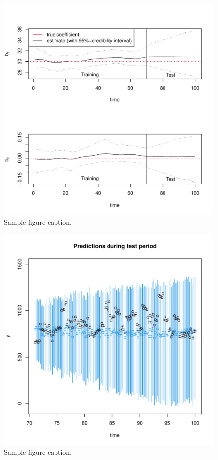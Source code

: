 \documentclass{article}
\begin{document}
\begin{figure}
	\centering
	\includegraphics{coefficients_over_time.pdf}
	\caption{Sample figure caption.}
	\label{fig:fig1}
\end{figure}

\begin{figure}
	\centering
	\includegraphics{compare_predictions_with_simulated_data.pdf}
	\caption{Sample figure caption.}
	\label{fig:fig1}
\end{figure}
\end{document}

